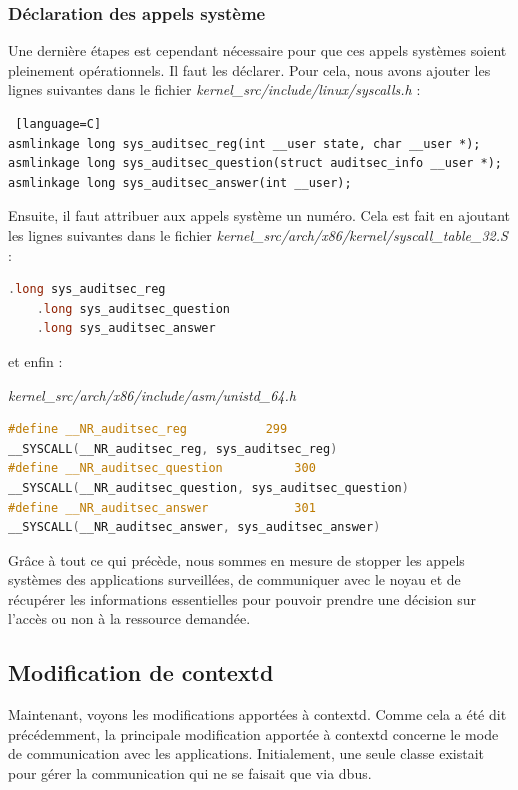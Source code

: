 \documentclass[pdftex,a4paper,titlepage,11pt]{article}
\begin{document}
\subsubsection{Déclaration des appels système}

Une dernière étapes est cependant nécessaire pour que ces appels systèmes soient pleinement opérationnels. Il faut les déclarer. Pour cela, nous avons ajouter les lignes suivantes dans le fichier \textit{{kernel\_src}/include/linux/syscalls.h} :
\begin{lstlisting} [language=C]
asmlinkage long sys_auditsec_reg(int __user state, char __user *);
asmlinkage long sys_auditsec_question(struct auditsec_info __user *);
asmlinkage long sys_auditsec_answer(int __user);
\end{lstlisting}

Ensuite, il faut attribuer aux appels système un numéro. Cela est fait en ajoutant les lignes suivantes dans le fichier \textit{{kernel\_src}/arch/x86/kernel/syscall\_table\_32.S} : %

\begin{lstlisting}[language=C]
	.long sys_auditsec_reg
	.long sys_auditsec_question
	.long sys_auditsec_answer
\end{lstlisting}

et enfin :

\textit{{kernel\_src}/arch/x86/include/asm/unistd\_64.h}
\begin{lstlisting}[language=C]
#define __NR_auditsec_reg			299
__SYSCALL(__NR_auditsec_reg, sys_auditsec_reg)
#define __NR_auditsec_question			300
__SYSCALL(__NR_auditsec_question, sys_auditsec_question)
#define __NR_auditsec_answer			301
__SYSCALL(__NR_auditsec_answer, sys_auditsec_answer)
\end{lstlisting}

Grâce à tout ce qui précède, nous sommes en mesure de stopper les appels systèmes des applications surveillées, de communiquer avec le noyau et de récupérer les informations essentielles pour pouvoir prendre une décision sur l'accès ou non à la ressource demandée.

\subsection{Modification de contextd}

Maintenant, voyons les modifications apportées à contextd. Comme cela a été dit précédemment, la principale modification apportée à contextd concerne le mode de communication avec les applications. Initialement, une seule classe existait pour gérer la communication qui ne se faisait que via dbus.
\end{document}
